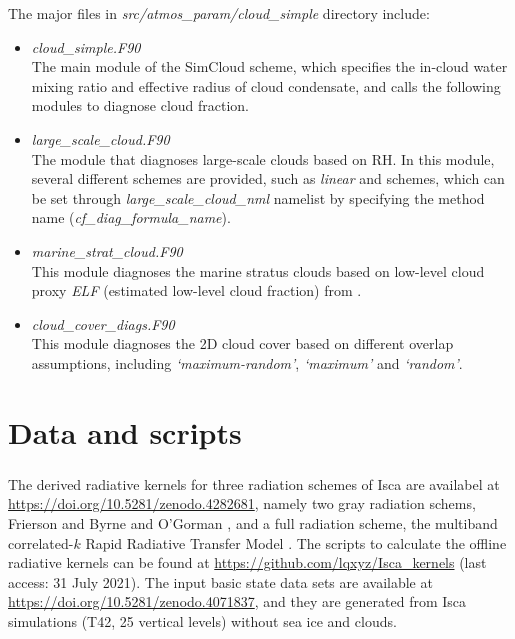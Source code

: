 The major files in \textit{src/atmos\_param/cloud\_simple} directory include:
\begin{itemize}
    \item \textit{cloud\_simple.F90} \\
    The main module of the SimCloud scheme, which specifies the in-cloud water mixing ratio and effective radius of cloud condensate, and calls the following modules to diagnose cloud fraction.
    
    \item \textit{large\_scale\_cloud.F90}\\
    The module that diagnoses large-scale clouds based on RH. In this module, several different schemes are provided, such as \textit{linear} and \textit{\cite{Sundqvist1989}} schemes, which can be set through \textit{large\_scale\_cloud\_nml} namelist by specifying the method name (\textit{cf\_diag\_formula\_name}).
    
    \item \textit{marine\_strat\_cloud.F90}\\
    This module diagnoses the marine stratus clouds based on low-level cloud proxy \textit{ELF} (estimated low-level cloud fraction) from \cite{Park2019}.

    \item \textit{cloud\_cover\_diags.F90}\\
    This module diagnoses the 2D cloud cover based on different overlap assumptions, including \textit{`maximum-random'}, \textit{`maximum'} and \textit{`random'}.
\end{itemize}

\section{Data and scripts}

\subsubsection{}

The derived radiative kernels for three radiation schemes of Isca are availabel at \url{https://doi.org/10.5281/zenodo.4282681}, namely two gray radiation schems, Frierson \citep{Frierson2006} and  Byrne and O'Gorman \citep[BOG;][]{Byrne2013}, and a full radiation scheme, the multiband correlated-$k$ Rapid Radiative Transfer Model \citep[RRTM;][]{Clough2005}. The scripts to calculate the offline radiative kernels can be found at \url{https://github.com/lqxyz/Isca_kernels} (last access: 31 July 2021). The input basic state data sets are available at \url{https://doi.org/10.5281/zenodo.4071837}, and they are generated from Isca simulations (T42, 25 vertical levels) without sea ice and clouds.

